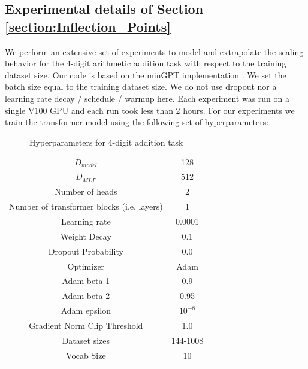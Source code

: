 \documentclass{article} %
\begin{document}

\subsection{Experimental details of Section \ref{section:Inflection_Points}}
\label{section:Inflection_points_experimental}
We perform an extensive set of experiments to model and extrapolate the scaling behavior for the 4-digit arithmetic addition task with respect to the training dataset size. Our code is based on the minGPT implementation \citep{Karpathy2020}. We set the batch size equal to the training dataset size. We do not use dropout nor a learning rate decay / schedule / warmup here. Each experiment was run on a single V100 GPU and each run took less than 2 hours. For our experiments we train the transformer model using the following set of hyperparameters:
\begin{table}[hbt!]
    \centering
    \begin{tabular}{c|c}
         $D_{model}$ & 128 \\
         $D_{MLP}$ & 512 \\
         Number of heads & 2 \\
         Number of transformer blocks (i.e. layers) & 1 \\
         Learning rate & 0.0001\\
         Weight Decay & 0.1\\
         Dropout Probability & 0.0\\
         Optimizer & Adam\\
         Adam beta 1 & 0.9\\
         Adam beta 2 & 0.95 \\
         Adam epsilon & $10^{-8}$\\
         Gradient Norm Clip Threshold & 1.0 \\
         Dataset sizes & 144-1008 \\
         Vocab Size & 10 \\
         
    \end{tabular}
    \caption{Hyperparameters for 4-digit addition task}
    \label{tab:my_label}
\end{table}
\end{document}
